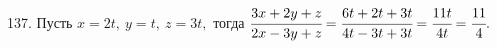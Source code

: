 137. Пусть $x=2t,\ y=t,\ z=3t,$ тогда $\cfrac{3x+2y+z}{2x-3y+z}=\cfrac{6t+2t+3t}{4t-3t+3t}=\cfrac{11t}{4t}=\cfrac{11}{4}.$\\
